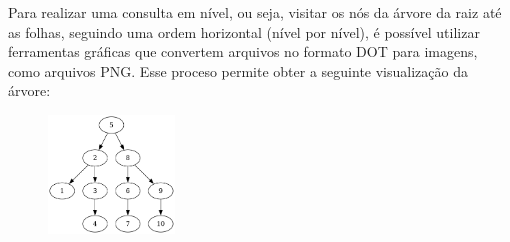 Para realizar uma consulta em nível, ou seja, visitar os nós da árvore da raiz até as folhas, seguindo uma ordem horizontal (nível por nível), é possível utilizar ferramentas gráficas que convertem arquivos no formato DOT para imagens, como arquivos PNG. Esse proceso permite obter a seguinte visualização da árvore:

\begin{figure}[h!]
    \centering
    \includegraphics[width=0.3\textwidth]{imagens/arvore_de_busca0.png}
    \caption{}
    \label{fig:exemplo}
\end{figure}

